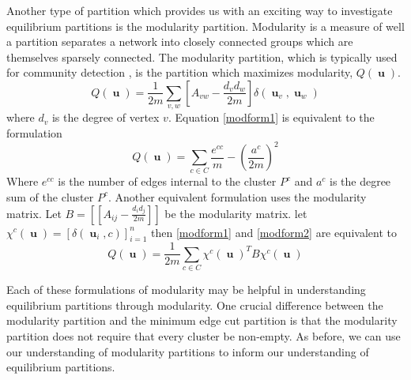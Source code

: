 \documentclass[]{article}
\DeclareMathOperator{\uu}{\mathbf{u}}
\begin{document}
	Another type of partition which provides us with an exciting way to investigate equilibrium partitions is the modularity partition.  Modularity is a measure of well a partition separates a network into closely connected groups which are themselves sparsely connected. The modularity partition, which is typically used for community detection \cite{Newman2006,Clauset2004}, is the partition which maximizes modularity,  $Q(\uu)$.
		\begin{equation}\label{modform1}
			Q(\uu) = \frac{1}{2m}\sum_{v,w}\left[A_{vw}-\frac{d_vd_w}{2m}\right]\delta(\uu_v,\uu_w)
		\end{equation}
		where $d_v$ is the degree of vertex $v$. Equation \eqref{modform1} is equivalent to the formulation
		\begin{equation}\label{modform2}
			Q(\uu)=\sum_{c\in C}\frac{e^{cc}}{m}-\left(\frac{a^c}{2m}\right)^2
		\end{equation}
		Where $e^{cc}$ is the number of edges internal to the cluster $P^c$ and $a^c$ is the degree sum of the cluster $P^c$. Another equivalent formulation uses the modularity matrix.
		Let $B=[[A_{ij}-\frac{d_id_j}{2m}]]$ be the modularity matrix. let $\chi^{c}(\uu)=[\delta (\uu_i,c)]_{i=1}^n$ then \eqref{modform1} and \eqref{modform2} are equivalent to 
		\begin{equation}
			Q(\uu)= \frac{1}{2m}\sum_{c\in C} {\chi^c(\uu)}^TB\chi^c(\uu)
		\end{equation}
	
		Each of these formulations of modularity may be helpful in understanding equilibrium partitions through modularity. One crucial difference between the modularity partition and the minimum edge cut partition is that the modularity partition does not require that every cluster be non-empty. As before, we can use our understanding of modularity partitions to inform our understanding of equilibrium partitions. 
		
\end{document}
